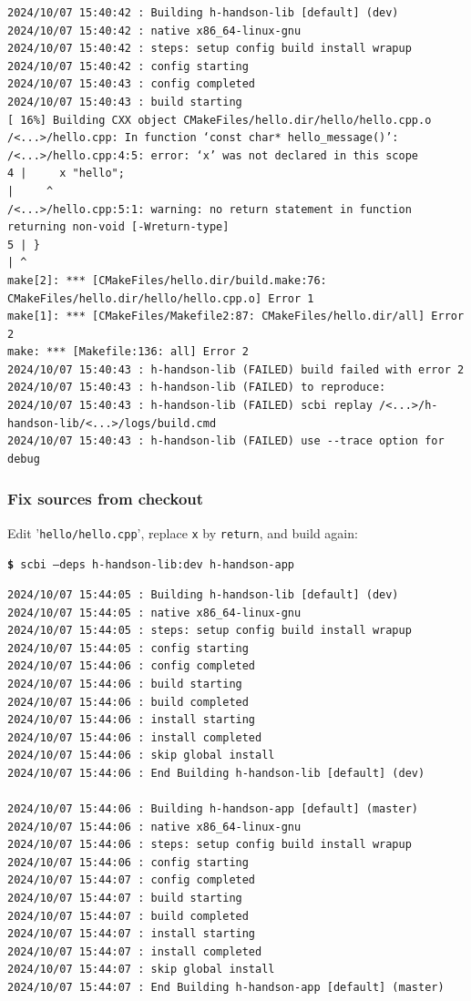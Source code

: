 \documentclass[a4paper,12pt,twoside]{article}
\newcommand{\code}[1]{\texttt{#1}}
\newcommand{\file}[1]{'{\texttt{#1}}'}
\newcommand{\cmd}[1]{\tabto{1cm}\hspace{0.5cm}\texttt{\textbf{\$} #1}}
\begin{document}
\begin{footnotesize}
	\begin{verbatim}
2024/10/07 15:40:42 : Building h-handson-lib [default] (dev)
2024/10/07 15:40:42 : native x86_64-linux-gnu
2024/10/07 15:40:42 : steps: setup config build install wrapup
2024/10/07 15:40:42 : config starting
2024/10/07 15:40:43 : config completed
2024/10/07 15:40:43 : build starting
[ 16%] Building CXX object CMakeFiles/hello.dir/hello/hello.cpp.o
/<...>/hello.cpp: In function ‘const char* hello_message()’:
/<...>/hello.cpp:4:5: error: ‘x’ was not declared in this scope
4 |     x "hello";
|     ^
/<...>/hello.cpp:5:1: warning: no return statement in function returning non-void [-Wreturn-type]
5 | }
| ^
make[2]: *** [CMakeFiles/hello.dir/build.make:76: CMakeFiles/hello.dir/hello/hello.cpp.o] Error 1
make[1]: *** [CMakeFiles/Makefile2:87: CMakeFiles/hello.dir/all] Error 2
make: *** [Makefile:136: all] Error 2
2024/10/07 15:40:43 : h-handson-lib (FAILED) build failed with error 2
2024/10/07 15:40:43 : h-handson-lib (FAILED) to reproduce:
2024/10/07 15:40:43 : h-handson-lib (FAILED) scbi replay /<...>/h-handson-lib/<...>/logs/build.cmd
2024/10/07 15:40:43 : h-handson-lib (FAILED) use --trace option for debug
\end{verbatim}
\end{footnotesize}

\subsubsection{Fix sources from checkout}

Edit \file{hello/hello.cpp}, replace \code{x} by \code{return}, and build again:

\cmd{scbi --deps h-handson-lib:dev h-handson-app}

\begin{verbatim}
2024/10/07 15:44:05 : Building h-handson-lib [default] (dev)
2024/10/07 15:44:05 : native x86_64-linux-gnu
2024/10/07 15:44:05 : steps: setup config build install wrapup
2024/10/07 15:44:05 : config starting
2024/10/07 15:44:06 : config completed
2024/10/07 15:44:06 : build starting
2024/10/07 15:44:06 : build completed
2024/10/07 15:44:06 : install starting
2024/10/07 15:44:06 : install completed
2024/10/07 15:44:06 : skip global install
2024/10/07 15:44:06 : End Building h-handson-lib [default] (dev)

2024/10/07 15:44:06 : Building h-handson-app [default] (master)
2024/10/07 15:44:06 : native x86_64-linux-gnu
2024/10/07 15:44:06 : steps: setup config build install wrapup
2024/10/07 15:44:06 : config starting
2024/10/07 15:44:07 : config completed
2024/10/07 15:44:07 : build starting
2024/10/07 15:44:07 : build completed
2024/10/07 15:44:07 : install starting
2024/10/07 15:44:07 : install completed
2024/10/07 15:44:07 : skip global install
2024/10/07 15:44:07 : End Building h-handson-app [default] (master)
\end{verbatim}
\end{document}
